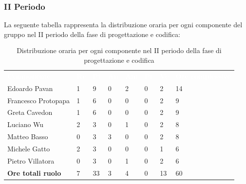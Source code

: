 \subsubsection{II Periodo}
La seguente tabella rappresenta la distribuzione oraria per ogni componente del gruppo nel II periodo della fase di progettazione e codifica:
\begin{table}[H]
\begin{center}
\renewcommand{\arraystretch}{1.25}
\begin{tabular}{ m{}<{\centering}  m{}<{\centering} m{}<{\centering} m{}<{\centering}  m{}<{\centering}  m{}<{\centering}  m{}<{\centering}  m{}<{\centering}   }
	\rowcolor{darkblue}
	\textcolor{white}{\textbf{Componente}} &\textcolor{white}{\textbf{Re}}&\textcolor{white}{\textbf{Pt}}&\textcolor{white}{\textbf{An}}&\textcolor{white}{\textbf{Am}}&\textcolor{white}{\textbf{Pr}}&\textcolor{white}{\textbf{Ve}}&\textcolor{white}{\textbf{Ore complessive}}\\ 
	Edoardo Pavan & 1 & 9 & 0 & 2 & 0 & 2 & 14 \\	
	
	Francesco Protopapa & 1 & 6 & 0 & 0 & 0 & 2 & 9 \\

	Greta Cavedon & 1 & 6 & 0 & 0 & 0 & 2 & 9 \\
	
	Luciano Wu & 2 & 3 & 0 & 1 & 0 & 2 & 8 \\
	
	Matteo Basso & 0 & 3 & 3 & 0 & 0 & 2 & 8 \\
	
	Michele Gatto & 2 & 3 & 0 & 0 & 0 & 1 & 6 \\
	
	Pietro Villatora & 0 & 3 & 0 & 1 & 0 & 2 & 6 \\
	
	\textbf{Ore totali ruolo} & 7 & 33 & 3 & 4 & 0 & 13 & 60 \\

\end{tabular}
\caption{Distribuzione oraria per ogni componente nel II periodo della fase di progettazione e codifica}
\end{center}
\end{table}

